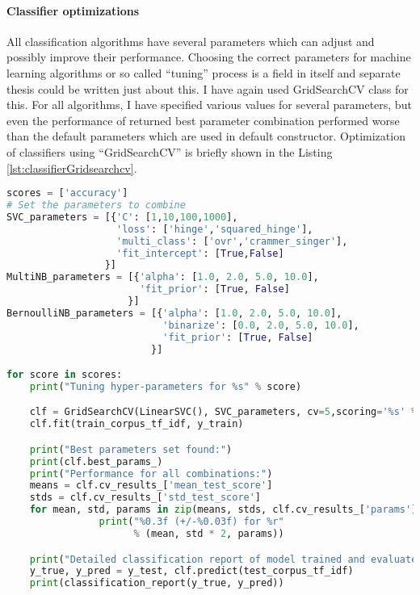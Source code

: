 \paragraph{Classifier optimizations}
All classification algorithms have several parameters which can adjust and possibly improve their performance. Choosing the correct parameters for machine learning algorithms or so called “tuning” process is a field in itself and separate thesis could be written just about this. I have again used GridSearchCV class for this. For all algorithms, I have specified various values for several parameters, but even the performance of returned best parameter combination performed worse than the default parameters which are used in default constructor. Optimization of classifiers using “GridSearchCV” is briefly shown in the Listing \ref{lst:classifierGridsearchcv}.
\\
\begin{lstlisting}[caption={Tuning of classifiers using “GridSearchCV” class },label={lst:classifierGridsearchcv},language=Python]
scores = ['accuracy']
# Set the parameters to combine
SVC_parameters = [{'C': [1,10,100,1000],
                   'loss': ['hinge','squared_hinge'],
                   'multi_class': ['ovr','crammer_singer'],
                   'fit_intercept': [True,False]
                 }]
MultiNB_parameters = [{'alpha': [1.0, 2.0, 5.0, 10.0],
                       'fit_prior': [True, False]
                     }]
BernoulliNB_parameters = [{'alpha': [1.0, 2.0, 5.0, 10.0],
                           'binarize': [0.0, 2.0, 5.0, 10.0],
                           'fit_prior': [True, False]
                         }]

for score in scores:
    print("Tuning hyper-parameters for %s" % score)

    clf = GridSearchCV(LinearSVC(), SVC_parameters, cv=5,scoring='%s' % score)
    clf.fit(train_corpus_tf_idf, y_train)

    print("Best parameters set found:")
    print(clf.best_params_)
    print("Performance for all combinations:")
    means = clf.cv_results_['mean_test_score']
    stds = clf.cv_results_['std_test_score']
    for mean, std, params in zip(means, stds, clf.cv_results_['params']):
                print("%0.3f (+/-%0.03f) for %r"
                      % (mean, std * 2, params))

    print("Detailed classification report of model trained and evaluated on full dev/eval sets:")
    y_true, y_pred = y_test, clf.predict(test_corpus_tf_idf)
    print(classification_report(y_true, y_pred))
\end{lstlisting}    


